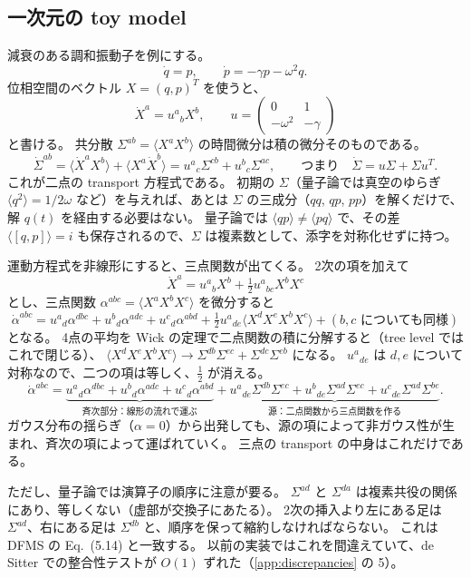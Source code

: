 \documentclass[a4paper,11pt]{ltjsarticle}
\begin{document}
\subsection{一次元の toy model}

減衰のある調和振動子を例にする。
\[
\dot q=p,\qquad \dot p=-\gamma p-\omega^2q .
\]
位相空間のベクトル $X=(q,p)^T$ を使うと、
\[
\dot X^a=u^a{}_bX^b,\qquad u=\begin{pmatrix}0&1\\-\omega^2&-\gamma\end{pmatrix}
\]
と書ける。
共分散 $\Sigma^{ab}=\langle X^aX^b\rangle$ の時間微分は積の微分そのものである。
\[
\dot\Sigma^{ab}=\langle\dot X^aX^b\rangle+\langle X^a\dot X^b\rangle=u^a{}_c\Sigma^{cb}+u^b{}_c\Sigma^{ac},
\qquad\text{つまり}\quad\dot\Sigma=u\Sigma+\Sigma u^T .
\]
これが二点の transport 方程式である。
初期の $\Sigma$（量子論では真空のゆらぎ $\langle q^2\rangle=1/2\omega$ など）を与えれば、あとは $\Sigma$ の三成分（$qq$, $qp$, $pp$）を解くだけで、解 $q(t)$ を経由する必要はない。
量子論では $\langle qp\rangle\neq\langle pq\rangle$ で、その差 $\langle[q,p]\rangle=i$ も保存されるので、$\Sigma$ は複素数として、添字を対称化せずに持つ。

運動方程式を非線形にすると、三点関数が出てくる。
2次の項を加えて
\[
\dot X^a=u^a{}_bX^b+\tfrac12u^a{}_{bc}X^bX^c
\]
とし、三点関数 $\alpha^{abc}=\langle X^aX^bX^c\rangle$ を微分すると
\[
\dot\alpha^{abc}=u^a{}_d\alpha^{dbc}+u^b{}_d\alpha^{adc}+u^c{}_d\alpha^{abd}
+\tfrac12u^a{}_{de}\langle X^dX^eX^bX^c\rangle+(\text{$b,c$ についても同様})
\]
となる。
4点の平均を Wick の定理で二点関数の積に分解すると（tree level ではこれで閉じる）、
$\langle X^dX^eX^bX^c\rangle\to\Sigma^{db}\Sigma^{ec}+\Sigma^{dc}\Sigma^{eb}$ になる。
$u^a{}_{de}$ は $d,e$ について対称なので、二つの項は等しく、$\tfrac12$ が消える。
\begin{equation}
\dot\alpha^{abc}=\underbrace{u^a{}_d\alpha^{dbc}+u^b{}_d\alpha^{adc}+u^c{}_d\alpha^{abd}}_{\text{斉次部分：線形の流れで運ぶ}}
+\underbrace{u^a{}_{de}\Sigma^{db}\Sigma^{ec}+u^b{}_{de}\Sigma^{ad}\Sigma^{ec}+u^c{}_{de}\Sigma^{ad}\Sigma^{be}}_{\text{源：二点関数から三点関数を作る}} .
\label{eq:toy3}
\end{equation}
ガウス分布の揺らぎ（$\alpha=0$）から出発しても、源の項によって非ガウス性が生まれ、斉次の項によって運ばれていく。
三点の transport の中身はこれだけである。

ただし、量子論では演算子の順序に注意が要る。
$\Sigma^{ad}$ と $\Sigma^{da}$ は複素共役の関係にあり、等しくない（虚部が交換子にあたる）。
2次の挿入より左にある足は $\Sigma^{ad}$、右にある足は $\Sigma^{db}$ と、順序を保って縮約しなければならない。
これは DFMS の Eq.~(5.14)\cite{DFMS2016} と一致する。
以前の実装ではこれを間違えていて、de Sitter での整合性テストが $O(1)$ ずれた（\ref{app:discrepancies} の 5）。
\end{document}
